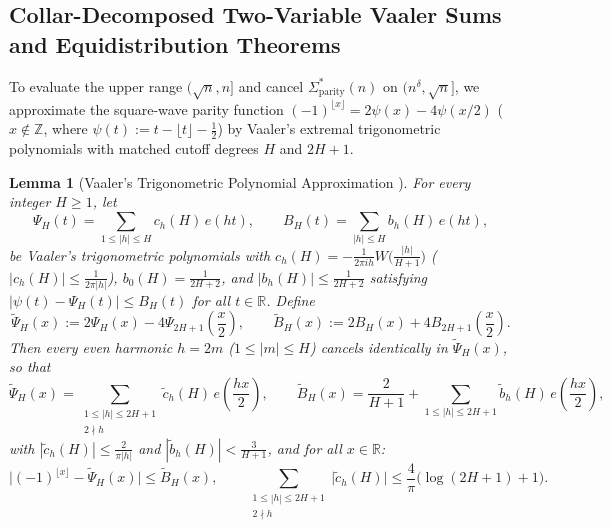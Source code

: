 \documentclass[11pt,reqno]{amsart}
\newtheorem{lemma}[theorem]{Lemma}
\theoremstyle{remark}
\numberwithin{equation}{section}
\newcommand{\Z}{\mathbb{Z}}
\newcommand{\R}{\mathbb{R}}
\newcommand{\Sparitys}{\Sigma_{\mathrm{parity}}^*}
\begin{document}
\subsection{Collar-Decomposed Two-Variable Vaaler Sums and Equidistribution Theorems}
To evaluate the upper range $(\sqrt{n}, n]$ and cancel $\Sparitys(n)$ on $(n^\delta, \sqrt{n}]$, we approximate the square-wave parity function $(-1)^{\lfloor x \rfloor} = 2\psi(x) - 4\psi(x/2)$ ($x \notin \Z$, where $\psi(t) := t - \lfloor t \rfloor - \frac{1}{2}$) by Vaaler's extremal trigonometric polynomials \cite[Theorem~18]{Vaaler1985} with matched cutoff degrees $H$ and $2H + 1$.

\begin{lemma}[{Vaaler's Trigonometric Polynomial Approximation {\cite[Theorem~18]{Vaaler1985}}}]\label{lem:2.3}
For every integer $H \ge 1$, let
\[
\Psi_H(t) = \sum_{1 \le |h| \le H} c_h(H)\,e(ht), \qquad B_H(t) = \sum_{|h| \le H} b_h(H)\,e(ht),
\]
be Vaaler's trigonometric polynomials with $c_h(H) = -\frac{1}{2\pi i h} W\bigl(\frac{|h|}{H+1}\bigr)$ ($|c_h(H)| \le \frac{1}{2\pi |h|}$), $b_0(H) = \frac{1}{2H+2}$, and $|b_h(H)| \le \frac{1}{2H+2}$ satisfying $|\psi(t) - \Psi_H(t)| \le B_H(t)$ for all $t \in \R$. Define
\begin{equation}\label{eq:2.8}
\widetilde{\Psi}_H(x) := 2\Psi_H(x) - 4\Psi_{2H+1}\!\left(\frac{x}{2}\right), \qquad \widetilde{B}_H(x) := 2B_H(x) + 4B_{2H+1}\!\left(\frac{x}{2}\right).
\end{equation}
Then every even harmonic $h = 2m$ ($1 \le |m| \le H$) cancels identically in $\widetilde{\Psi}_H(x)$, so that
\[
\widetilde{\Psi}_H(x) = \sum_{\substack{1 \le |h| \le 2H+1 \\ 2 \nmid h}} \tilde{c}_h(H)\,e\!\left(\frac{hx}{2}\right), \qquad \widetilde{B}_H(x) = \frac{2}{H + 1} + \sum_{1 \le |h| \le 2H+1} \tilde{b}_h(H)\,e\!\left(\frac{hx}{2}\right),
\]
with $|\tilde{c}_h(H)| \le \frac{2}{\pi |h|}$ and $|\tilde{b}_h(H)| < \frac{3}{H+1}$, and for all $x \in \R$:
\begin{equation}\label{eq:2.9}
\bigl|(-1)^{\lfloor x \rfloor} - \widetilde{\Psi}_H(x)\bigr| \le \widetilde{B}_H(x), \qquad \sum_{\substack{1 \le |h| \le 2H+1 \\ 2 \nmid h}} \bigl|\tilde{c}_h(H)\bigr| \le \frac{4}{\pi}\bigl(\log(2H + 1) + 1\bigr).
\end{equation}
\end{lemma}
\end{document}
